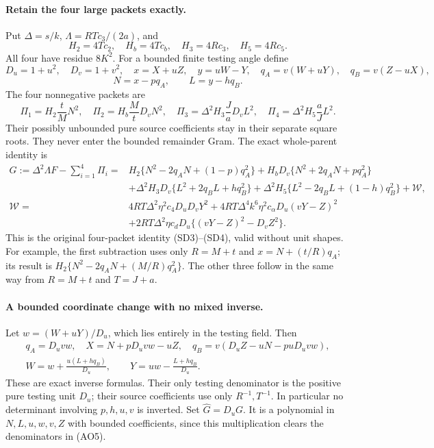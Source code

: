 \paragraph{Retain the four large packets exactly.}
Put $\Delta=s/k$, $\Lambda=RTc_3/(2a)$, and
\[
 H_2=4Tc_2,\quad H_b=4Tc_b,\quad H_3=4Rc_3,\quad H_5=4Rc_5.
\]
All four have residue $8K^2$. For a bounded finite testing angle define
\[
 D_u=1+u^2,\quad D_v=1+v^2,\quad
 x=X+uZ,\quad y=uW-Y,\quad
 q_A=v(W+uY),\quad q_B=v(Z-uX),
\]
\[
                    N=x-pq_A,\qquad L=y-hq_B.
\]
The four nonnegative packets are
\[
 \Pi_1=H_2\frac tM N^2,\quad
 \Pi_2=H_b\frac MtD_vN^2,\quad
 \Pi_3=\Delta^2H_3\frac JaD_vL^2,\quad
 \Pi_4=\Delta^2H_5\frac aJL^2.                         \tag{AO3}
\]
Their possibly unbounded pure source coefficients stay in their
separate square roots. They never enter the bounded remainder Gram.
The exact whole-parent identity is
\begin{align*}
 G:=\Delta^2\Lambda F-\sum_{i=1}^4\Pi_i
 ={}&H_2\{N^2-2q_AN+(1-p)q_A^2\}
     +H_bD_v\{N^2+2q_AN+pq_A^2\}\\
 &+\Delta^2H_3D_v\{L^2+2q_BL+hq_B^2\}
     +\Delta^2H_5\{L^2-2q_BL+(1-h)q_B^2\}
     +\mathcal W,                                      \tag{AO4}\\
 \mathcal W={}&4RT\Delta^2\eta^2c_4D_uD_vY^2
   +4RT\Delta^4k^6\eta^2c_\alpha D_u(vY-Z)^2\\
 &+2RT\Delta^2\eta c_dD_u\{(vY-Z)^2-D_vZ^2\}.
\end{align*}
This is the original four-packet identity (SD3)--(SD4), valid without
unit shapes. For example, the first subtraction uses only
$R=M+t$ and $x=N+(t/R)q_A$; its result is
$H_2\{N^2-2q_AN+(M/R)q_A^2\}$. The other three follow in the
same way from $R=M+t$ and $T=J+a$.

\paragraph{A bounded coordinate change with no mixed inverse.}
Let $w=(W+uY)/D_u$, which lies entirely in the testing field. Then
\[
\begin{gathered}
 q_A=D_uv w,\quad
 X=N+pD_uv w-uZ,\quad
 q_B=v(D_uZ-uN-puD_uv w),\\
 W=w+\frac{u(L+hq_B)}{D_u},\qquad
 Y=uw-\frac{L+hq_B}{D_u}.                             \tag{AO5}
\end{gathered}
\]
These are exact inverse formulas. Their only testing denominator is
the positive pure testing unit $D_u$; their source coefficients use
only $R^{-1},T^{-1}$. In particular no determinant involving $p,h,u,v$
is inverted. Set $\widehat G=D_uG$. It is a polynomial in
$N,L,u,w,v,Z$ with bounded coefficients, since this multiplication
clears the denominators in (AO5).

